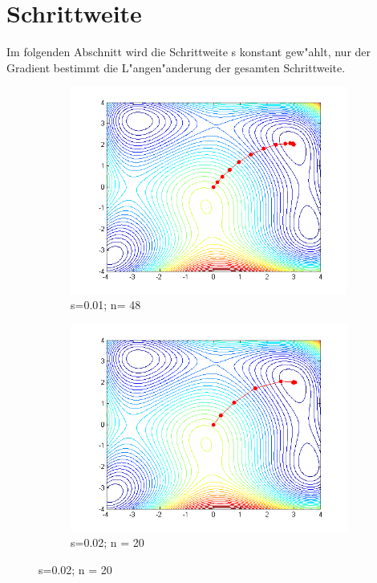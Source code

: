 \section{Schrittweite}
Im folgenden Abschnitt wird die Schrittweite s konstant gew"ahlt, nur
der Gradient bestimmt die L"angen"anderung der gesamten Schrittweite.


\begin{figure}[h]
\centering
\begin{subfigure}[b]{0.49\textwidth}
\centering
\includegraphics[width=\textwidth]{descent/HB_1.png}
\caption{s=0.01; n= 48}\label{schrittweite_a}
\end{subfigure} \begin{subfigure}[b]{0.49\textwidth}
\centering
\includegraphics[width=\textwidth]{descent/HB_2.png}
\caption{s=0.02; n = 20}\label{schrittweite_b}
\end{subfigure}


\end{figure}
